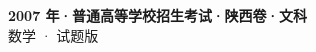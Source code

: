 \documentclass[zihao=-4, a4paper]{ctexart}
\begin{document}
\begin{center}
  {\Large\bfseries 2007 年·普通高等学校招生考试·陕西卷·文科}\\[4pt]
  {\large 数学 · 试题版}
\end{center}
\medskip
{}

\end{document}
